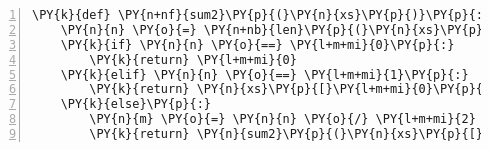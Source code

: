 \begin{Verbatim}[commandchars=\\\{\},numbers=left,firstnumber=1,stepnumber=1,codes={\catcode`\$=3\catcode`\^=7\catcode`\_=8}]
\PY{k}{def} \PY{n+nf}{sum2}\PY{p}{(}\PY{n}{xs}\PY{p}{)}\PY{p}{:}
    \PY{n}{n} \PY{o}{=} \PY{n+nb}{len}\PY{p}{(}\PY{n}{xs}\PY{p}{)}
    \PY{k}{if} \PY{n}{n} \PY{o}{==} \PY{l+m+mi}{0}\PY{p}{:}
        \PY{k}{return} \PY{l+m+mi}{0}
    \PY{k}{elif} \PY{n}{n} \PY{o}{==} \PY{l+m+mi}{1}\PY{p}{:}
        \PY{k}{return} \PY{n}{xs}\PY{p}{[}\PY{l+m+mi}{0}\PY{p}{]}
    \PY{k}{else}\PY{p}{:}
        \PY{n}{m} \PY{o}{=} \PY{n}{n} \PY{o}{/} \PY{l+m+mi}{2}
        \PY{k}{return} \PY{n}{sum2}\PY{p}{(}\PY{n}{xs}\PY{p}{[}\PY{p}{:}\PY{n}{m}\PY{p}{]}\PY{p}{)} \PY{o}{+} \PY{n}{sum2}\PY{p}{(}\PY{n}{xs}\PY{p}{[}\PY{n}{m}\PY{p}{:}\PY{p}{]}\PY{p}{)}
\end{Verbatim}
